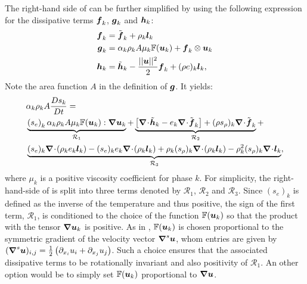 The right-hand side of  can be further simplified by using the following expression
for the dissipative terms $\boldsymbol f_k$,  $\boldsymbol g_k$ and $\boldsymbol h_k$:
\begin{align}\label{eq:def-diss-terms-sect4}
  \boldsymbol f_k &= \tilde{\boldsymbol f}_k + \rho_k \boldsymbol l_k 
  \\
  \boldsymbol g_k &= \alpha_k \rho_k A \mu_k \mathbb{F}(\boldsymbol u_k) + \boldsymbol f_k \otimes \boldsymbol u_k
  \\
  \boldsymbol h_k &= \tilde{\boldsymbol h}_k - \frac{|| \boldsymbol u||^2 }{2} \boldsymbol f_k + (\rho e)_k \boldsymbol l_k,
\end{align}
Note the area function $A$ in the definition of $\boldsymbol g$. It yields:
%
\begin{align}\label{eq:ent-res-7-eqn-diss-terms2}
&\alpha_k \rho_k A \frac{Ds_k}{Dt} = \nonumber \\
&\underbrace{\left(s_e\right)_k \alpha_k \rho_k A \mu_k \mathbb{F}(\mbold u_k) : \grad \mbold u_k}_{\mathcal{R}_1} +
\underbrace{\left[ \div \tilde{\mbold h}_k  - e_k \div \tilde{\mbold f}_k  \right] + (\rho s_\rho)_k \div \tilde{\mbold f}_k}_{\mathcal{R}_2} + \nonumber \\
&\underbrace{(s_e)_k \div \left( \rho_k e_k \mbold l_k \right) -  (s_e)_k e_k \div \left( \rho_k \mbold l_k \right) + \rho_k (s_\rho)_k \div \left( \rho_k \mbold l_k \right) 
  - \rho_k^2 (s_\rho)_k \div \mbold l_k}_{\mathcal{R}_3},
\end{align}
%
where $\mu_k$ is a positive viscosity coefficient for phase $k$. For simplicity, the right-hand-side of  is split into three terms denoted by $\mathcal{R}_1$, $\mathcal{R}_2$ and $\mathcal{R}_3$. Since $(s_e)_k$ is defined as the inverse of the temperature and thus positive, the sign of the first term, $\mathcal{R}_1$, is conditioned to the choice of the function $\mathbb{F}(\boldsymbol u_k)$ so that the product with the tensor $\boldsymbol{\nabla} \boldsymbol u_k$ is positive. As in \cite{jlg}, $\mathbb{F}(\boldsymbol u_k)$ is chosen proportional to the symmetric gradient of the velocity vector $\boldsymbol{\nabla}^s \boldsymbol u$, whom entries are given by $(\boldsymbol{\nabla}^s \boldsymbol u)_{i,j} = \frac{1}{2} \left( \partial_{x_i} u_i + \partial_{x_j} u_j \right)$. Such a choice ensures that the associated dissipative terms to be rotationally invariant and also positivity of $\mathcal{R}_1$. An other option would be to simply set $\mathbb{F}(\boldsymbol u_k)$ proportional to $\boldsymbol{\nabla} \boldsymbol u$.  

